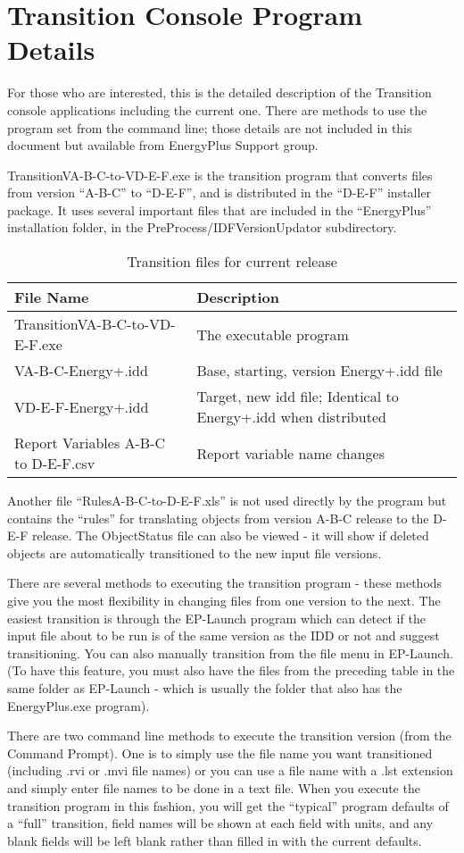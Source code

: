 \section{Transition Console Program Details}\label{transition-console-program-details}

For those who are interested, this is the detailed description of the Transition console applications including the current one. There are methods to use the program set from the command line; those details are not included in this document but available from EnergyPlus Support group.

TransitionVA-B-C-to-VD-E-F.exe is the transition program that converts files from version ``A-B-C'' to ``D-E-F'', and is distributed in the ``D-E-F'' installer package. It uses several important files that are included in the ``EnergyPlus'' installation folder, in the PreProcess/IDFVersionUpdator subdirectory.

\begin{longtable}[c]{p{2.14in}p{3.85in}}
\caption{Transition files for current release \protect \label{table:transition-files-for-current-release}}\\
\toprule 
File Name & Description \tabularnewline \midrule
\endhead
TransitionVA-B-C-to-VD-E-F.exe & The executable program \tabularnewline
VA-B-C-Energy+.idd & Base, starting, version Energy+.idd file \tabularnewline
VD-E-F-Energy+.idd & Target, new idd file; Identical to Energy+.idd when distributed \tabularnewline
Report Variables A-B-C to D-E-F.csv & Report variable name changes \tabularnewline
\bottomrule
\end{longtable}

Another file ``RulesA-B-C-to-D-E-F.xls'' is not used directly by the program but contains the ``rules'' for translating objects from version A-B-C release to the D-E-F release. The ObjectStatus file can also be viewed - it will show if deleted objects are automatically transitioned to the new input file versions.

There are several methods to executing the transition program - these methods give you the most flexibility in changing files from one version to the next. The easiest transition is through the EP-Launch program which can detect if the input file about to be run is of the same version as the IDD or not and suggest transitioning. You can also manually transition from the file menu in EP-Launch. (To have this feature, you must also have the files from the preceding table in the same folder as EP-Launch - which is usually the folder that also has the EnergyPlus.exe program).

There are two command line methods to execute the transition version (from the Command Prompt). One is to simply use the file name you want transitioned (including .rvi or .mvi file names) or you can use a file name with a .lst extension and simply enter file names to be done in a text file. When you execute the transition program in this fashion, you will get the ``typical'' program defaults of a ``full'' transition, field names will be shown at each field with units, and any blank fields will be left blank rather than filled in with the current defaults.
